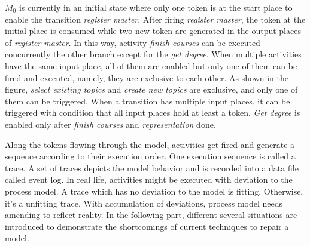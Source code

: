 $M_0$ is currently in an initial state where only one token is at the start place to enable the transition \emph{register master}. After firing \emph{register master}, the token at the initial place is consumed while two new token are generated in the output places of \emph{register master}. In this way, activity \emph{finish courses}  can be executed concurrently the other branch except for the \emph{get degree}. When multiple activities have the same input place, all of them are enabled but only one of them can be fired and executed, namely, they are exclusive to each other. As shown in the figure,  \emph{select existing topics}  and \emph{create new topics} are exclusive, and only one of them can be triggered. When a transition has multiple input places, it can be triggered with condition that all input places hold at least a token. \emph{Get degree} is enabled only after \emph{finish courses} and \emph{representation} done. 


Along the tokens flowing through the model, activities get fired and generate a sequence according to their execution order. One execution sequence is called a trace. A set of traces depicts the model behavior and is recorded into a data file called event log. In real life, activities might be executed with deviation to the process model. A trace which has no deviation to the model is fitting. Otherwise, it's a unfitting trace. With accumulation of deviations, process model needs amending to reflect reality.  In the following part, different several situations are introduced to demonstrate the shortcomings of current techniques to repair a model. 
